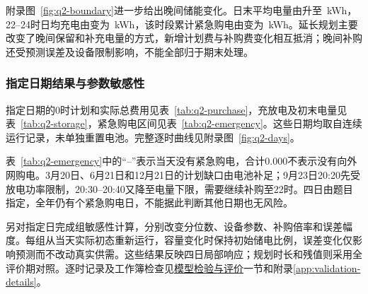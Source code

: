 附录图~\ref{fig:q2-boundary}进一步给出晚间储能变化。日末平均电量由\QBOldEndMean 升至\QBEndMean\ kWh，22--24时日均充电由\QBOldLateCharge 变为\QBLateCharge\ kWh，该时段累计紧急购电由\QBOldLateEmergency 变为\QBLateEmergency\ kWh。延长规划主要改变了晚间保留和补充电量的方式，新增计划费与补购费变化相互抵消；晚间补购还受预测误差及设备限制影响，不能全部归于期末处理。

\subsubsection{指定日期结果与参数敏感性}

指定日期的0时计划和实际总费用见表~\ref{tab:q2-purchase}，充放电及初末电量见表~\ref{tab:q2-storage}，紧急购电区间见表~\ref{tab:q2-emergency}。这些日期均取自连续运行记录，未单独重置电池。完整逐时曲线见附录图~\ref{fig:q2-days}。

\begingroup
\renewcommand{\arraystretch}{0.9}


\endgroup


表~\ref{tab:q2-emergency}中的“--”表示当天没有紧急购电，合计0.000不表示没有向外网购电。3月20日、6月21日和12月21日的计划缺口由电池补足；9月23日20:20先受放电功率限制，20:30--20:40又降至电量下限，需要继续补购至22时。四日由题目指定，全年仍有\QBEmergencyDays 个紧急购电日，不能据此判断其他日期也无风险。

另对指定日完成\QBSensitivityCases 组敏感性计算，分别改变分位数、设备参数、补购倍率和误差幅度。每组从当天实际初态重新运行，容量变化时保持初始储电比例，误差变化仅影响预测而不改动真实供需。这些结果反映四日局部响应；规划时长和残值则采用全评价期对照。逐时记录及工作簿检查见\hyperref[sec:model-validation]{模型检验与评价}一节和附录\ref{app:validation-details}。
